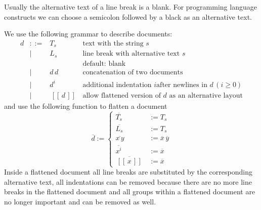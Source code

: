 \documentclass[12pt]{article}
\def\GS{\,[\![\,}
\def\GE{\,]\!]\,}
\def\group#1{\GS #1 \GE}
\newcommand{\flatten}[1]{\overline{#1}}
\begin{document}
Usually the alternative text of a line break is a blank. For programming
language constructs we can choose a semicolon followed by a black as an
alternative text.

We use the following grammar to describe documents:
$$
\begin{array}{llll}
  d &::=& T_s     & \text{text with the string } s
  \\
    & \mid & L_s  & \text{line break with alternative text } s
  \\ & & &\text{default: blank}
  \\
    & \mid & d\, d & \text{concatenation of two documents}
  \\
    & \mid & d^i   & \text{additional indentation $i$
                     after newlines in } d\, (i \ge 0)
  \\
    & \mid & \group{d} & \text{allow flattened version of $d$ as an
                         alternative layout}
\end{array}
$$%
and use the following function to flatten a document
$$
\flatten{d} :=
\begin{cases}
  \flatten{T_s} &:= T_s
  \\
  \flatten{L_s} &:= T_s
  \\
  \flatten{x\, y} &:= \flatten{x} \, \flatten{y}
  \\
  \flatten{x^i} &:= \flatten{x}
  \\
  \flatten{\group{x}} &:= \flatten{x}
\end{cases}
$$
%
Inside a flattened document all line breaks are substituted by the
corresponding alternative text, all indentations can be removed because there
are no more line breaks in the flattened document and all groups within a
flattened document are no longer important and can be removed as well.
\end{document}
